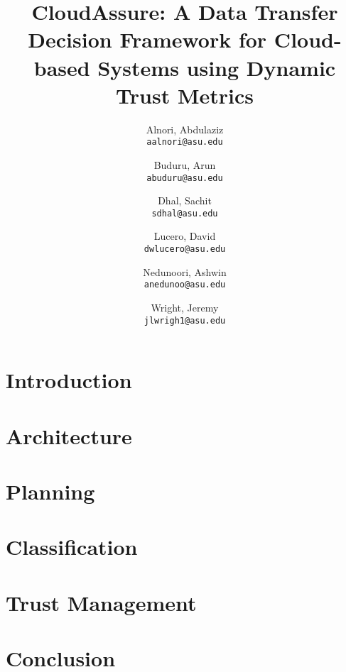 \documentclass[12pt,a4paper]{report}
\title{CloudAssure: A Data Transfer Decision Framework for 
Cloud-based Systems using Dynamic Trust 
Metrics}
\author{
    Alnori, Abdulaziz \\ 
    \texttt{aalnori@asu.edu}
    \and
    Buduru, Arun\\
    \texttt{abuduru@asu.edu}
    \and
    Dhal, Sachit\\
    \texttt{sdhal@asu.edu}
    \and
    Lucero, David\\ 
    \texttt{dwlucero@asu.edu}
    \and
    Nedunoori, Ashwin\\
    \texttt{anedunoo@asu.edu}
    \and
    Wright, Jeremy\\
    \texttt{jlwrigh1@asu.edu}
}
\begin{document}
\maketitle
\tableofcontents
\clearpage
\chapter{Introduction}


\chapter{Architecture}


\chapter{Planning}


\chapter{Classification}


\chapter{Trust Management}


\chapter{Conclusion}


\clearpage
\printbibliography
\end{document}

